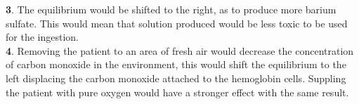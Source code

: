 \documentclass[12pt]{article}
\begin{document}
\noindent
\textbf 3. The equilibrium would be shifted to the right, as to produce more barium sulfate. This would mean that solution produced would be less toxic to be used for the ingestion. \\

\noindent
\textbf 4. Removing the patient to an area of fresh air would decrease the concentration of carbon monoxide in the environment, this would shift the equilibrium to the left displacing the carbon monoxide attached to the hemoglobin cells. Suppling the patient with pure oxygen would have a stronger effect with the same result. \\
\end{document}
